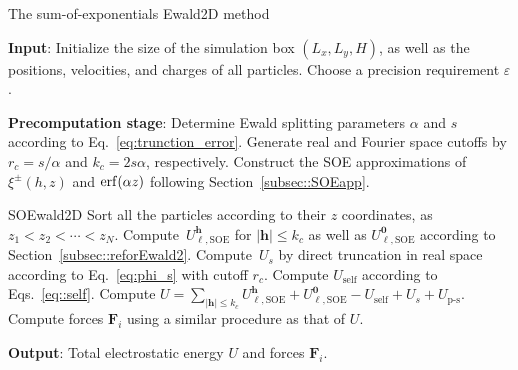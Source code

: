 \begin{algorithm}[ht] 
	\caption{The sum-of-exponentials Ewald2D method}
	\begin{algorithmic}[1]
		\State \textbf{Input}: Initialize the size of the simulation box $(L_x, L_y, H)$, as well as the positions, velocities, and charges of all particles. Choose a precision requirement $\varepsilon$.  %
		
		\State \textbf{Precomputation stage}: Determine Ewald splitting parameters $\alpha$ and $s$ according to Eq.~\eqref{eq:trunction_error}. Generate real and Fourier space cutoffs by $r_c=s/\alpha$ and $k_c=2s\alpha$, respectively. Construct the SOE approximations of $\xi^{\pm}(h,z)$ and $\operatorname{erf}(\alpha z)$ following Section~\ref{subsec::SOEapp}.
		
		\Procedure\textnormal{SOEwald2D}{}   
		\State Sort all the particles according to their $z$ coordinates, as $z_1 < z_2 < \cdots < z_N$.
		\State Compute~$U_{\ell,\text{SOE}}^{\bm{h}}$ for $|\bm{h}|\leq k_c$ as well as $U_{\ell,\text{SOE}}^{\bm{0}}$ according to Section~\ref{subsec::reforEwald2}. 
		\State Compute~$U_{s}$ by direct truncation in real space according to Eq.~\eqref{eq:phi_s} with cutoff $r_c$. %
		\State Compute $U_{\text{self}}$ according to Eqs.~\eqref{eq::self}.
		\State Compute $U = \sum_{|\bm{h}|\leq k_c} U_{\ell, \text{SOE}}^{\bm{h}} + U_{\ell,\text{SOE}}^{\bm{0}} - U_{\text{self}} + U_{s} + U_{\text{p-s}}$.
		\State Compute forces $\bm{F}_{i}$ using a similar procedure as that of $U$.
		\EndProcedure
		
		\State \textbf{Output}: Total electrostatic energy $U$ and forces $\bm{F}_{i}$.
		
	\end{algorithmic}\label{alg:SOEwald2D}
\end{algorithm}

